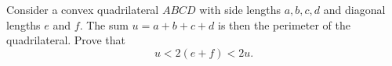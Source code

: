 Consider a convex quadrilateral $ABCD$ with side lengths $a,b,c,d$ and diagonal lengths $e$ and $f$. The sum $u=a+b+c+d$ is then the perimeter of the quadrilateral. Prove that \[u < 2(e + f) < 2u.\]
